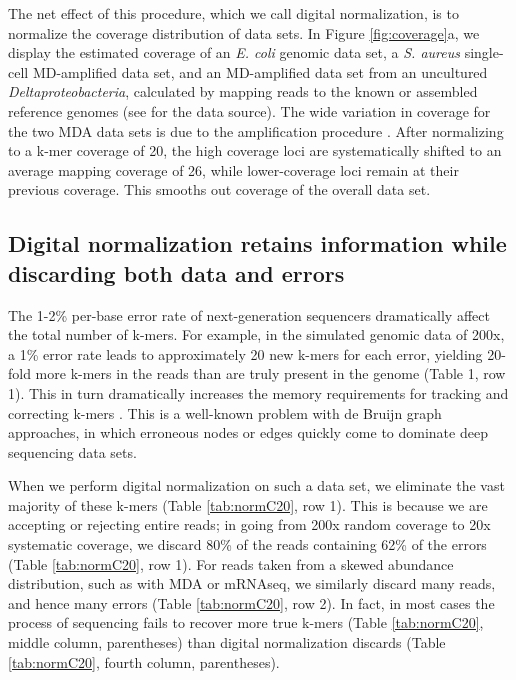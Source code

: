 \documentclass{pnastwo}
\begin{document}
\begin{article}
The net effect of this procedure, which we call digital normalization,
is to normalize the coverage distribution of data sets.  In Figure
\ref{fig:coverage}a, we display the estimated coverage of an {\em
  E. coli} genomic data set, a {\em S. aureus} single-cell
MD-amplified data set, and an MD-amplified data set from an uncultured
{\em Deltaproteobacteria}, calculated by mapping reads to the known or
assembled reference genomes (see \cite{pubmed21926975} for the data
source).  The wide variation in coverage for the two MDA data sets is
due to the amplification procedure \cite{pubmed17487184}.  After
normalizing to a k-mer coverage of 20, the high coverage loci are
systematically shifted to an average mapping coverage of 26, while
lower-coverage loci remain at their previous coverage.  This smooths
out coverage of the overall data set.


\subsection{Digital normalization retains information while discarding
both data and errors}

The 1-2\% per-base error rate of next-generation sequencers
dramatically affect the total number of k-mers.  For example, in the
simulated genomic data of 200x, a 1\% error rate leads to
approximately 20 new k-mers for each error, yielding 20-fold more
k-mers in the reads than are truly present in the genome (Table 1, row
1).  This in turn dramatically increases the memory requirements for
tracking and correcting k-mers \cite{pubmed21245053}.  This is a
well-known problem with de Bruijn graph approaches, in which erroneous
nodes or edges quickly come to dominate deep sequencing data sets.

When we perform digital normalization on such a data set, we eliminate
the vast majority of these k-mers (Table \ref{tab:normC20}, row 1).
This is because we are accepting or rejecting entire reads; in
going from 200x random coverage to 20x systematic coverage, we
discard 80\% of the reads containing 62\% of the errors (Table
\ref{tab:normC20}, row 1).  For reads taken from a skewed abundance
distribution, such as with MDA or mRNAseq, we similarly discard many
reads, and hence many errors (Table \ref{tab:normC20}, row 2).  In
fact, in most cases the process of sequencing fails to recover
more true k-mers (Table \ref{tab:normC20}, middle column, parentheses) than
digital
normalization discards (Table \ref{tab:normC20}, fourth column, parentheses).


\end{article}
\end{document}
